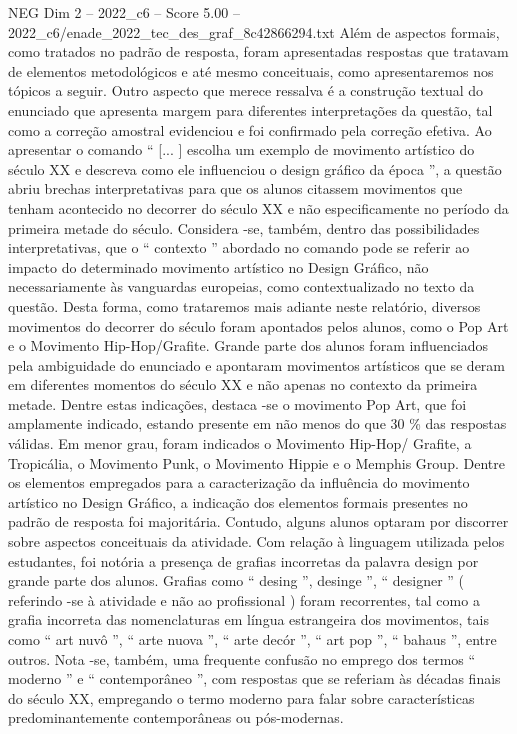 \begin{textsample}{NEG Dim 2 – 2022\_c6 – Score 5.00 – 2022\_c6/enade\_2022\_tec\_des\_graf\_8c42866294.txt}
Além de aspectos formais, como tratados no padrão de resposta, foram apresentadas respostas que tratavam de elementos metodológicos e até mesmo conceituais, como apresentaremos nos tópicos a seguir.
Outro aspecto que merece ressalva é a construção textual do enunciado que apresenta margem para diferentes interpretações da questão, tal como a correção amostral evidenciou e foi confirmado pela correção efetiva.
Ao apresentar o comando “ [... ] escolha um exemplo de movimento artístico do século XX e descreva como ele influenciou o design gráfico da época ”, a questão abriu brechas interpretativas para que os alunos citassem movimentos que tenham acontecido no decorrer do século XX e não especificamente no período da primeira metade do século.
Considera -se, também, dentro das possibilidades interpretativas, que o “ contexto ” abordado no comando pode se referir ao impacto do determinado movimento artístico no Design Gráfico, não necessariamente às vanguardas europeias, como contextualizado no texto da questão.
Desta forma, como trataremos mais adiante neste relatório, diversos movimentos do decorrer do século foram apontados pelos alunos, como o Pop Art e o Movimento Hip-Hop/Grafite.
Grande parte dos alunos foram influenciados pela ambiguidade do enunciado e apontaram movimentos artísticos que se deram em diferentes momentos do século XX e não apenas no contexto da primeira metade.
Dentre estas indicações, destaca -se o movimento Pop Art, que foi amplamente indicado, estando presente em não menos do que 30 \% das respostas válidas.
Em menor grau, foram indicados o Movimento Hip-Hop/ Grafite, a Tropicália, o Movimento Punk, o Movimento Hippie e o Memphis Group.
Dentre os elementos empregados para a caracterização da influência do movimento artístico no Design Gráfico, a indicação dos elementos formais presentes no padrão de resposta foi majoritária.
Contudo, alguns alunos optaram por discorrer sobre aspectos conceituais da atividade.
Com relação à linguagem utilizada pelos estudantes, foi notória a presença de grafias incorretas da palavra design por grande parte dos alunos.
Grafias como “ desing ”, desinge ”, “ designer ” ( referindo -se à atividade e não ao profissional ) foram recorrentes, tal como a grafia incorreta das nomenclaturas em língua estrangeira dos movimentos, tais como “ art nuvô ”, “ arte nuova ”, “ arte decór ”, “ art pop ”, “ bahaus ”, entre outros.
Nota -se, também, uma frequente confusão no emprego dos termos “ moderno ” e “ contemporâneo ”, com respostas que se referiam às décadas finais do século XX, empregando o termo moderno para falar sobre características predominantemente contemporâneas ou pós-modernas.

\end{textsample}
